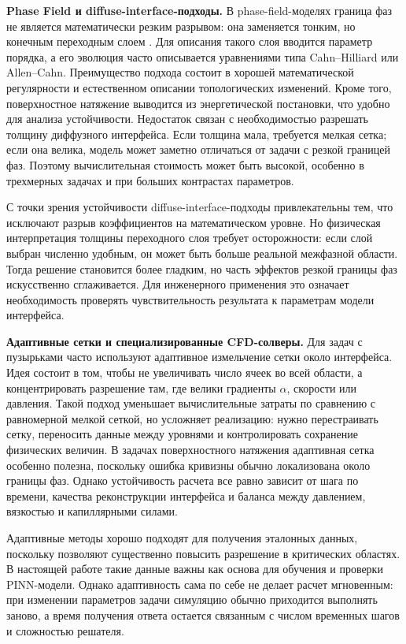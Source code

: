 \documentclass[12pt,a4paper]{article}
\begin{document}
\textbf{Phase Field и diffuse-interface-подходы.}
В phase-field-моделях граница фаз не является математически резким разрывом:
она заменяется тонким, но конечным переходным слоем \cite{Anderson1998}. Для
описания такого слоя вводится параметр порядка, а его эволюция часто
описывается уравнениями типа Cahn--Hilliard или Allen--Cahn. Преимущество
подхода состоит в хорошей математической регулярности и естественном описании
топологических изменений. Кроме того, поверхностное натяжение выводится из
энергетической постановки, что удобно для анализа устойчивости. Недостаток
связан с необходимостью разрешать толщину диффузного интерфейса. Если толщина
мала, требуется мелкая сетка; если она велика, модель может заметно отличаться
от задачи с резкой границей фаз. Поэтому вычислительная стоимость может быть
высокой, особенно в трехмерных задачах и при больших контрастах параметров.

С точки зрения устойчивости diffuse-interface-подходы привлекательны тем, что
исключают разрыв коэффициентов на математическом уровне. Но физическая
интерпретация толщины переходного слоя требует осторожности: если слой выбран
численно удобным, он может быть больше реальной межфазной области. Тогда
решение становится более гладким, но часть эффектов резкой границы фаз
искусственно сглаживается. Для инженерного применения это означает
необходимость проверять чувствительность результата к параметрам модели
интерфейса.

\textbf{Адаптивные сетки и специализированные CFD-солверы.}
Для задач с пузырьками часто используют адаптивное измельчение сетки около
интерфейса. Идея состоит в том, чтобы не увеличивать число ячеек во всей
области, а концентрировать разрешение там, где велики градиенты \(\alpha\),
скорости или давления. Такой подход уменьшает вычислительные затраты по
сравнению с равномерной мелкой сеткой, но усложняет реализацию: нужно
перестраивать сетку, переносить данные между уровнями и контролировать
сохранение физических величин. В задачах поверхностного натяжения адаптивная
сетка особенно полезна, поскольку ошибка кривизны обычно локализована около
границы фаз. Однако устойчивость расчета все равно зависит от шага по времени,
качества реконструкции интерфейса и баланса между давлением, вязкостью и
капиллярными силами.

Адаптивные методы хорошо подходят для получения эталонных данных, поскольку
позволяют существенно повысить разрешение в критических областях. В настоящей
работе такие данные важны как основа для обучения и проверки PINN-модели.
Однако адаптивность сама по себе не делает расчет мгновенным: при изменении
параметров задачи симуляцию обычно приходится выполнять заново, а время
получения ответа остается связанным с числом временных шагов и сложностью
решателя.
\end{document}
